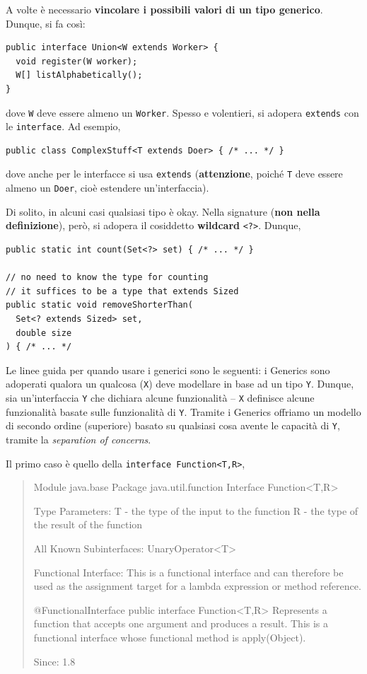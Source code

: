 \documentclass[\fontsizeclass,twocolumn]{\classname}
\theoremstyle{definition}
\theoremstyle{definition}
\begin{document}
A volte è necessario \textbf{vincolare i possibili valori di un tipo generico}.
Dunque, si fa così:

\begin{lstlisting}
public interface Union<W extends Worker> {
  void register(W worker);
  W[] listAlphabetically();
}
\end{lstlisting}

dove \texttt{W} deve essere almeno un \texttt{Worker}. Spesso e volentieri, si
adopera \texttt{extends} con le \texttt{interface}. Ad esempio,

\begin{lstlisting}
public class ComplexStuff<T extends Doer> { /* ... */ }
\end{lstlisting}

dove anche per le interfacce si usa \texttt{extends} (\textbf{attenzione},
poiché \texttt{T} deve essere almeno un \texttt{Doer}, cioè estendere
un'interfaccia).

Di solito, in alcuni casi qualsiasi tipo è okay. Nella signature (\textbf{non
nella definizione}), però, si adopera il cosiddetto \textbf{wildcard}
\texttt{<?>}. Dunque, 

\begin{lstlisting}
public static int count(Set<?> set) { /* ... */ }

// no need to know the type for counting
// it suffices to be a type that extends Sized
public static void removeShorterThan(
  Set<? extends Sized> set,
  double size
) { /* ... */
\end{lstlisting}

Le linee guida per quando usare i generici sono le seguenti: i Generics sono
adoperati qualora un qualcosa (\texttt{X}) deve modellare in base ad un tipo
\texttt{Y}. Dunque, sia un'interfaccia \texttt{Y} che dichiara alcune
funzionalità -- \texttt{X} definisce alcune funzionalità basate sulle
funzionalità di \texttt{Y}. Tramite i Generics offriamo un modello di secondo
ordine (superiore) basato su qualsiasi cosa avente le capacità di \texttt{Y},
tramite la \emph{separation of concerns}.

Il primo caso è quello della \texttt{interface Function<T,R>}, 
\begin{quote}
    \footnotesize{Module java.base
Package java.util.function
Interface Function<T,R>

Type Parameters:
T - the type of the input to the function
R - the type of the result of the function

All Known Subinterfaces:
UnaryOperator<T>

Functional Interface:
This is a functional interface and can therefore be used as the assignment target for a lambda expression or method reference.

@FunctionalInterface
public interface Function<T,R>
Represents a function that accepts one argument and produces a result.
This is a functional interface whose functional method is apply(Object).

Since:
1.8
}
\end{quote}
\end{document}
